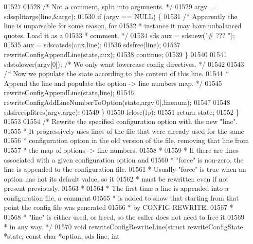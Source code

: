 \begin{DoxyCode}
{{{{{{{{{{{{{{01527 
01528         \textcolor{comment}{/* Not a comment, split into arguments. */}
01529         argv = sdssplitargs(line,&argc);
01530         \textcolor{keywordflow}{if} (argv == NULL) \{
01531             \textcolor{comment}{/* Apparently the line is unparsable for some reason, for}
01532 \textcolor{comment}{             * instance it may have unbalanced quotes. Load it as a}
01533 \textcolor{comment}{             * comment. */}
01534             sds aux = sdsnew(\textcolor{stringliteral}{"# ??? "});
01535             aux = sdscatsds(aux,line);
01536             sdsfree(line);
01537             rewriteConfigAppendLine(state,aux);
01538             \textcolor{keywordflow}{continue};
01539         \}
01540 
01541         sdstolower(argv[0]); \textcolor{comment}{/* We only want lowercase config directives. */}
01542 
01543         \textcolor{comment}{/* Now we populate the state according to the content of this line.}
01544 \textcolor{comment}{         * Append the line and populate the option -> line numbers map. */}
01545         rewriteConfigAppendLine(state,line);
01546         rewriteConfigAddLineNumberToOption(state,argv[0],linenum);
01547 
01548         sdsfreesplitres(argv,argc);
01549     \}
01550     fclose(fp);
01551     \textcolor{keywordflow}{return} state;
01552 \}
01553 
01554 \textcolor{comment}{/* Rewrite the specified configuration option with the new "line".}
01555 \textcolor{comment}{ * It progressively uses lines of the file that were already used for the same}
01556 \textcolor{comment}{ * configuration option in the old version of the file, removing that line from}
01557 \textcolor{comment}{ * the map of options -> line numbers.}
01558 \textcolor{comment}{ *}
01559 \textcolor{comment}{ * If there are lines associated with a given configuration option and}
01560 \textcolor{comment}{ * "force" is non-zero, the line is appended to the configuration file.}
01561 \textcolor{comment}{ * Usually "force" is true when an option has not its default value, so it}
01562 \textcolor{comment}{ * must be rewritten even if not present previously.}
01563 \textcolor{comment}{ *}
01564 \textcolor{comment}{ * The first time a line is appended into a configuration file, a comment}
01565 \textcolor{comment}{ * is added to show that starting from that point the config file was generated}
01566 \textcolor{comment}{ * by CONFIG REWRITE.}
01567 \textcolor{comment}{ *}
01568 \textcolor{comment}{ * "line" is either used, or freed, so the caller does not need to free it}
01569 \textcolor{comment}{ * in any way. */}
01570 \textcolor{keywordtype}{void} rewriteConfigRewriteLine(\textcolor{keyword}{struct} rewriteConfigState *state, \textcolor{keyword}{const} \textcolor{keywordtype}{char} *option, sds line, \textcolor{keywordtype}{int} 
}}}}}}}}}}}}}}
\end{DoxyCode}
